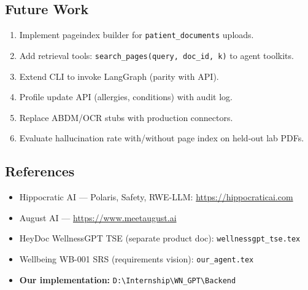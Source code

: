 \documentclass[12pt,a4paper]{article}
\begin{document}
\subsection{Future Work}

\begin{enumerate}[noitemsep]
    \item Implement pageindex builder for \texttt{patient\_documents} uploads.
    \item Add retrieval tools: \texttt{search\_pages(query, doc\_id, k)} to agent toolkits.
    \item Extend CLI to invoke LangGraph (parity with API).
    \item Profile update API (allergies, conditions) with audit log.
    \item Replace ABDM/OCR stubs with production connectors.
    \item Evaluate hallucination rate with/without page index on held-out lab PDFs.
\end{enumerate}

\subsection{References}

\begin{itemize}[noitemsep]
    \item Hippocratic AI --- Polaris, Safety, RWE-LLM: \url{https://hippocraticai.com}
    \item August AI --- \url{https://www.meetaugust.ai}
    \item HeyDoc WellnessGPT TSE (separate product doc): \texttt{wellnessgpt\_tse.tex}
    \item Wellbeing WB-001 SRS (requirements vision): \texttt{our\_agent.tex}
    \item \textbf{Our implementation:} \texttt{D:\textbackslash Internship\textbackslash WN\_GPT\textbackslash Backend}
\end{itemize}
\end{document}
